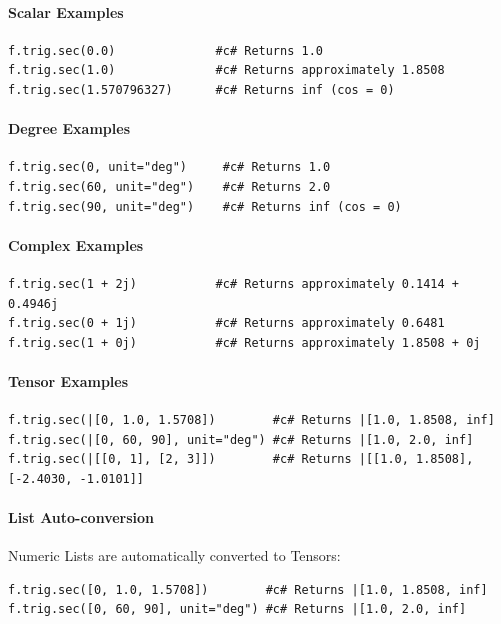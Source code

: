 \paragraph{Scalar Examples}
\begin{verbatim}
f.trig.sec(0.0)              #c# Returns 1.0
f.trig.sec(1.0)              #c# Returns approximately 1.8508
f.trig.sec(1.570796327)      #c# Returns inf (cos = 0)
\end{verbatim}

\paragraph{Degree Examples}
\begin{verbatim}
f.trig.sec(0, unit="deg")     #c# Returns 1.0
f.trig.sec(60, unit="deg")    #c# Returns 2.0
f.trig.sec(90, unit="deg")    #c# Returns inf (cos = 0)
\end{verbatim}

\paragraph{Complex Examples}
\begin{verbatim}
f.trig.sec(1 + 2j)           #c# Returns approximately 0.1414 + 0.4946j
f.trig.sec(0 + 1j)           #c# Returns approximately 0.6481
f.trig.sec(1 + 0j)           #c# Returns approximately 1.8508 + 0j
\end{verbatim}

\paragraph{Tensor Examples}
\begin{verbatim}
f.trig.sec(|[0, 1.0, 1.5708])        #c# Returns |[1.0, 1.8508, inf]
f.trig.sec(|[0, 60, 90], unit="deg") #c# Returns |[1.0, 2.0, inf]
f.trig.sec(|[[0, 1], [2, 3]])        #c# Returns |[[1.0, 1.8508], [-2.4030, -1.0101]]
\end{verbatim}

\paragraph{List Auto-conversion}
Numeric Lists are automatically converted to Tensors:
\begin{verbatim}
f.trig.sec([0, 1.0, 1.5708])        #c# Returns |[1.0, 1.8508, inf]
f.trig.sec([0, 60, 90], unit="deg") #c# Returns |[1.0, 2.0, inf]
\end{verbatim}

